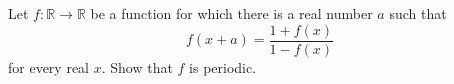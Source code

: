 Let $f : \mathbb{R} \to \mathbb{R}$ be a function for which there is a real number $a$ such that
\[
f(x + a) = \frac{1 + f(x)}{1 - f(x)}
\]
for every real $x$. Show that $f$ is periodic.
